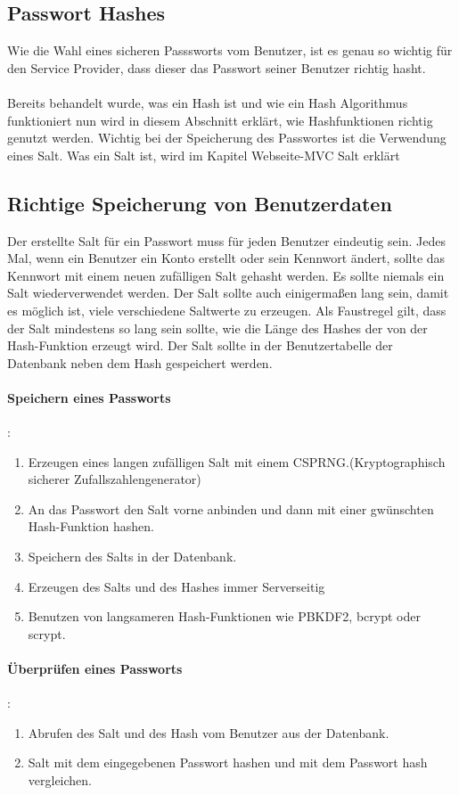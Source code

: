 {\subsection{Passwort Hashes}
\label{sec:pwdhash}
Wie die Wahl eines sicheren Passsworts vom Benutzer, ist es genau so wichtig für den Service Provider, dass dieser das Passwort seiner Benutzer richtig hasht.\\ \\Bereits behandelt wurde, was ein Hash ist und wie ein Hash Algorithmus funktioniert nun wird in diesem Abschnitt erklärt, wie Hashfunktionen richtig genutzt werden. Wichtig bei der Speicherung des Passwortes ist die Verwendung eines Salt. Was ein Salt ist, wird im Kapitel Webseite-MVC Salt erklärt
\subsection{Richtige Speicherung von Benutzerdaten}
Der erstellte Salt für ein Passwort muss für jeden Benutzer eindeutig sein. Jedes Mal, wenn ein Benutzer ein Konto erstellt oder sein Kennwort ändert, sollte das Kennwort mit einem neuen zufälligen Salt gehasht werden. Es sollte niemals ein Salt wiederverwendet werden. Der Salt sollte auch einigermaßen lang sein, damit es möglich ist, viele verschiedene Saltwerte zu erzeugen. Als Faustregel gilt, dass der Salt mindestens so lang sein sollte, wie die Länge des Hashes der von der Hash-Funktion erzeugt wird. Der Salt sollte in der Benutzertabelle der Datenbank neben dem Hash gespeichert werden.
\paragraph{Speichern eines Passworts}:\\
\begin{enumerate}
\item Erzeugen eines langen zufälligen Salt mit einem CSPRNG.(Kryptographisch sicherer Zufallszahlengenerator) 
\item An das Passwort den Salt vorne anbinden und dann mit einer gwünschten Hash-Funktion hashen.
\item Speichern des Salts in der Datenbank.
\item Erzeugen des Salts und des Hashes immer Serverseitig
\item Benutzen von langsameren Hash-Funktionen wie  PBKDF2, bcrypt oder scrypt.
\end{enumerate}
\paragraph{Überprüfen eines Passworts}:\\
\begin{enumerate}
\item Abrufen des Salt und des Hash vom Benutzer aus der Datenbank.
\item Salt mit dem eingegebenen Passwort hashen und mit dem Passwort hash vergleichen.
\end{enumerate}
}
